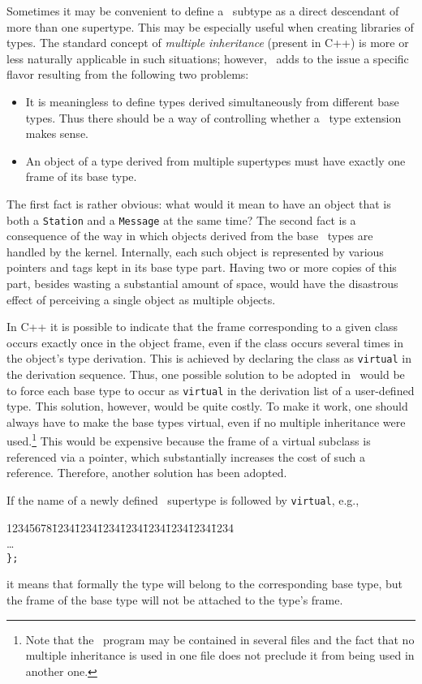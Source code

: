 Sometimes it may be convenient to define a \smurph\ subtype as a direct
descendant of more than one supertype.
This may be especially useful when creating libraries of types.
The standard concept of {\em multiple inheritance\/} (present in C++)
is more or less naturally applicable in such situations; however,
\smurph\ adds to the issue a specific flavor resulting from the
following two problems:
\begin{itemize}
\item
It is meaningless to define types derived simultaneously
from different base types.
Thus there should be a way of controlling whether a \smurph\ type extension
makes sense.
\item
An object of a type derived from multiple supertypes must have exactly one
frame of its base type.
\end{itemize}

The first fact is rather obvious: what would it mean to have an object that is
both a {\tt Station} and a {\tt Message} at the same time?
The second fact is a consequence of the way in which objects derived from the
base \smurph\ types are handled by the kernel.
Internally, each such object is represented by various pointers and tags
kept in its base type part.
Having two or more copies of this part, besides wasting a substantial amount of
space, would have the disastrous effect of
perceiving a single object as multiple objects.

In C++ it is possible to indicate that the frame corresponding to a given
class occurs exactly once in the object frame, even if the class occurs
several times in the object's type derivation.
This is achieved by declaring the class as {\tt virtual} in the derivation
sequence.
Thus, one possible solution to be adopted in \smurph\ would be to force
each base type to occur as {\tt virtual} in the derivation list of a
user-defined type.
This solution, however, would be quite costly.
To make it work, one should always have to make the base types virtual, even
if no multiple inheritance were used.\footnote {Note that the \smurph\ program
may be contained in several files and the fact that no multiple inheritance is
used in one file does not preclude it from being used in another one.}
This would be expensive because the frame of a virtual subclass is referenced
via a pointer, which substantially increases the cost of such a reference.
Therefore, another solution has been adopted.

If the name of a newly defined \smurph\ supertype is followed by
{\tt virtual}, e.g.,
{\tt\begin{tabbing}
12345678\=1234\=1234\=1234\=1234\=1234\=1234\=1234\=1234\kill
{}\\
\> \>\ldots \\
\> {\tt \};}
\end{tabbing}}
\noindent
it means that formally the type will belong to the corresponding base type,
but the frame of the base type will not be attached to the type's frame.

